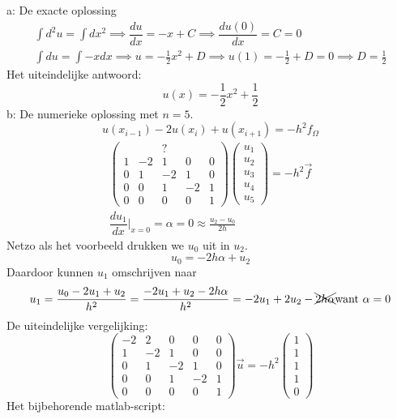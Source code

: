 \documentclass[11pt]{article}
\begin{document}
a: De exacte oplossing\\
\begin{gather*}
\int d^2u=\int dx^2 \implies \dfrac{du}{dx} = -x + C\implies \dfrac{du(0)}{dx} = C = 0\\
\int{du} = \int -x dx \implies u = -\frac{1}{2}x^2 + D \implies u(1) = -\frac{1}{2} + D = 0 \implies D = \frac{1}{2}
\end{gather*}
Het uiteindelijke antwoord:
$$u(x) = -\frac{1}{2}x^2 + \frac{1}{2}$$
b: De numerieke oplossing met $n = 5$.
$$
u(x_{i-1}) - 2u(x_{i}) + u(x_{i+1}) = -h^2f_{\Omega}
$$
\begin{gather*}
\begin{pmatrix}
	  &  & ?&  &  \\
	 1&-2& 1& 0& 0\\
	 0& 1&-2& 1& 0\\
	 0& 0& 1&-2& 1\\
	 0& 0& 0& 0& 1
\end{pmatrix}
\begin{pmatrix}
	u_{1}\\
	u_{2}\\
	u_{3}\\
	u_{4}\\
	u_{5}
\end{pmatrix}=-h^2\vec{f}\\
\dfrac{du_{1}}{dx}\Big|_{x = 0} = \alpha = 0\approx \frac{u_{2}-u_{0}}{2h}
\end{gather*}
Netzo als het voorbeeld drukken we $u_{0}$ uit in $u_{2}$.
$$
u_{0} = -2h\alpha + u_{2}
$$
Daardoor kunnen $u_{1}$ omschrijven naar
$$
u_{1} = \frac{u_{0}-2u_{1}+u_{2}}{h^2} = \frac{-2u_{1}+u_{2}-2h\alpha}{h^2} = -2u_{1} + 2u_{2} - \xcancel{2h\alpha} \text{want } \alpha = 0
$$
De uiteindelijke vergelijking:
$$
\begin{pmatrix}
	-2& 2& 0& 0& 0\\
	 1&-2& 1& 0& 0\\
	 0& 1&-2& 1& 0\\
	 0& 0& 1&-2& 1\\
	 0& 0& 0& 0& 1
\end{pmatrix}
\vec{u} = -h^2
\begin{pmatrix}
1\\
1\\
1\\
1\\
0
\end{pmatrix}
$$
\newpage
Het bijbehorende matlab-script:
\end{document}
